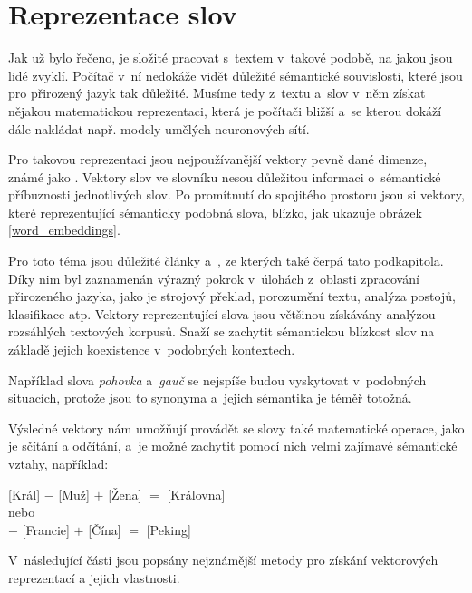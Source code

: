 \section{Reprezentace slov}
\label{reprezentace_slov}
Jak už bylo řečeno, je složité pracovat s~textem v~takové podobě, na jakou jsou lidé zvyklí. Počítač v~ní nedokáže vidět důležité sémantické souvislosti, které jsou pro přirozený jazyk tak důležité. Musíme tedy z~textu a~slov v~něm získat nějakou matematickou reprezentaci, která je počítači bližší a~se kterou dokáží dále nakládat např. modely umělých neuronových sítí. \par
Pro takovou reprezentaci jsou nejpoužívanější vektory pevně dané dimenze, známé jako . Vektory slov ve slovníku nesou důležitou informaci o~sémantické příbuznosti jednotlivých slov. Po promítnutí do spojitého prostoru jsou si vektory, které reprezentující sémanticky podobná slova, blízko, jak ukazuje obrázek \ref{word_embeddings}.\par
Pro toto téma jsou důležité články \cite{mikolov2013embeddings} a~\cite{mikolov2013_2}, ze kterých také čerpá tato podkapitola. Díky nim byl zaznamenán výrazný pokrok v~úlohách z~oblasti zpracování přirozeného jazyka, jako je strojový překlad, porozumění textu, analýza postojů, klasifikace atp.
Vektory reprezentující slova jsou většinou získávány analýzou rozsáhlých textových korpusů. Snaží se zachytit sémantickou blízkost slov na základě jejich koexistence v~podobných kontextech.\par 
Například slova \emph{pohovka} a~\emph{gauč} se nejspíše budou vyskytovat v~podobných situacích, protože jsou to synonyma a~jejich sémantika je téměř totožná.\par
Výsledné vektory nám umožňují provádět se slovy také matematické operace, jako je sčítání a odčítání, a~je možné zachytit pomocí nich velmi zajímavé sémantické vztahy, například:
\begin{center}
[Král] $-$ [Muž] $+$ [Žena] $=$ [Královna]\\
\medskip
nebo\\
\medskip
[Paříž] $-$ [Francie] $+$ [Čína] $=$ [Peking]
\end{center}

V~následující části jsou popsány nejznámější metody pro získání vektorových reprezentací a jejich vlastnosti.

